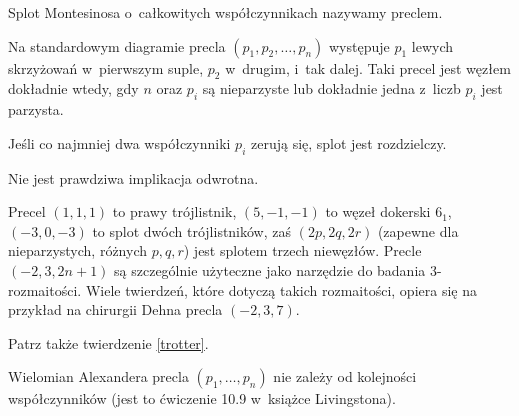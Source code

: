 \begin{definition}
	\label{def:pretzel}
	Splot Montesinosa o~całkowitych współczynnikach nazywamy preclem.
\end{definition}

Na standardowym diagramie precla $(p_1, p_2, \ldots, p_n)$ występuje $p_1$ lewych skrzyżowań w~pierwszym suple, $p_2$ w~drugim, i~tak dalej.
Taki precel jest węzłem dokładnie wtedy, gdy $n$ oraz $p_i$ są nieparzyste lub dokładnie jedna z~liczb $p_i$ jest parzysta.

\begin{proposition}
	Jeśli co najmniej dwa współczynniki $p_i$ zerują się, splot jest rozdzielczy.
\end{proposition}

Nie jest prawdziwa implikacja odwrotna.

Precel $(1,1,1)$ to prawy trójlistnik, $(5, -1, -1)$ to węzeł dokerski $6_1$, $(-3, 0, -3)$ to splot dwóch trójlistników, zaś $(2p, 2q, 2r)$ (zapewne dla nieparzystych, różnych $p, q, r$) jest splotem trzech niewęzłów.
Precle $(-2, 3, 2n+1)$ są szczególnie użyteczne jako narzędzie do badania 3-rozmaitości.
Wiele twierdzeń, które dotyczą takich rozmaitości, opiera się na przykład na chirurgii Dehna precla $(-2, 3, 7)$.

Patrz także twierdzenie \ref{trotter}.

Wielomian Alexandera precla $(p_1, \ldots, p_n)$ nie zależy od kolejności współczynników (jest to ćwiczenie 10.9 w~książce Livingstona).
